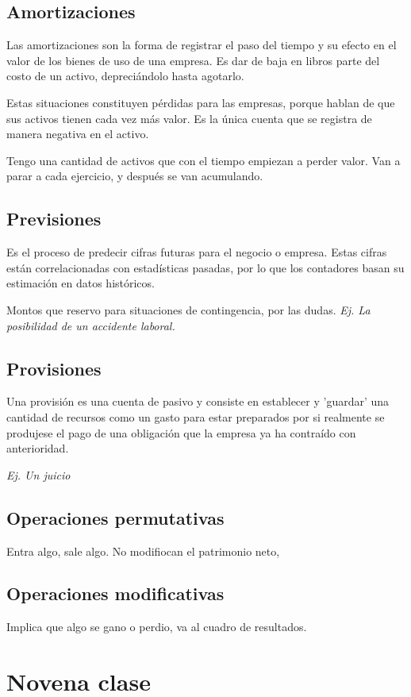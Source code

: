 \documentclass[titlepage,a4paper]{article}
\begin{document}
\subsection{Amortizaciones}
Las amortizaciones son la forma de registrar el paso del tiempo y su efecto en el valor de los bienes de
uso de una empresa. Es dar de baja en libros parte del costo de un activo, depreciándolo
hasta agotarlo.

Estas situaciones constituyen pérdidas para las empresas, porque hablan de que sus
activos tienen cada vez más valor. Es la única cuenta que se registra de manera negativa en el activo.

Tengo una cantidad de activos que con el tiempo empiezan a perder valor. Van a parar a cada ejercicio, y después se van acumulando.

\subsection{Previsiones}
Es el proceso de predecir cifras futuras para el negocio o empresa. Estas cifras están correlacionadas con estadísticas pasadas, por lo que los contadores basan su estimación
en datos históricos.

Montos que reservo para situaciones de contingencia, por las dudas. \textit{Ej. La posibilidad de un accidente laboral.}

\subsection{Provisiones}
Una provisión es una cuenta de pasivo y consiste en establecer y 'guardar' una cantidad de recursos
como un gasto para estar preparados por si realmente se produjese el pago de una obligación que la empresa
ya ha contraído con anterioridad.

\textit{Ej. Un juicio}

\subsection*{Operaciones permutativas}
Entra algo, sale algo. No modifiocan el patrimonio neto,

\subsection*{Operaciones modificativas}
Implica que algo se gano o perdio, va al cuadro de resultados.

\section*{Novena clase}
\end{document}
